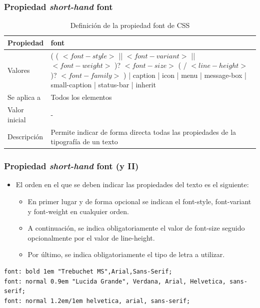 \begin{frame}
\frametitle{Propiedad \emph{short-hand} font}

\begin{center}
  \begin{table}
   \begin{tabular}{p{1.8cm}p{7.8cm}}
Propiedad & \bf{font} \\ \hline
Valores& ( ( $<font-style>$ || $<font-variant>$ || $<font-weight>$ )? $<font-size>$ ( / $<line-height>$ )? $<font-family>$ ) | caption | icon | menu | message-box | small-caption | status-bar | inherit \\ \hline
Se aplica a& Todos los elementos \\ \hline
Valor inicial& - \\ \hline
Descripción& Permite indicar de forma directa todas las propiedades de la tipografía de un texto \\ \hline
  \end{tabular}
   \caption{Definición de la propiedad font de CSS}
 \end{table}
\end{center}


\end{frame}



\begin{frame}[fragile]
\frametitle{Propiedad \emph{short-hand} font (y II)}

\begin{itemize}
  \item El orden en el que se deben indicar las propiedades del texto es el siguiente:
  \begin{itemize}
    \item En primer lugar y de forma opcional se indican el font-style, font-variant y font-weight en cualquier orden.
    \item A continuación, se indica obligatoriamente el valor de font-size seguido opcionalmente por el valor de line-height.
    \item Por último, se indica obligatoriamente el tipo de letra a utilizar.
  \end{itemize}
\end{itemize}

\begin{footnotesize}
\begin{verbatim}
font: bold 1em "Trebuchet MS",Arial,Sans-Serif;
font: normal 0.9em "Lucida Grande", Verdana, Arial, Helvetica, sans-serif;
font: normal 1.2em/1em helvetica, arial, sans-serif;
\end{verbatim}
\end{footnotesize}

\end{frame}


